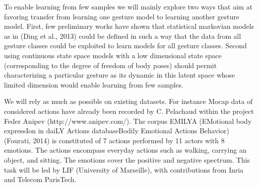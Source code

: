 To enable learning from few samples we will mainly explore two ways that aim at favoring transfer from learning one gesture model to learning another gesture model. First, few preliminary works have shown that statistical markovian models as in (Ding et al., 2013) could be defined in such a way that the data from all gesture classes could be exploited to learn models for all gesture classes. Second using continuous state space models with a low dimensional state space (corresponding to the degree of freedom of body poses) should permit characterizing a particular gesture as its dynamic in this latent space whose limited dimension would enable learning from few samples.  

We will rely as much as possible on existing datasets. For instance Mocap data of considered actions have already been recorded by C. Pelachaud within the project Feder Anipev (http://www.anipev.com/). The corpus EMILYA (EMotional body expressIon in daiLY Actions databaseBodily Emotional Actions Behavior) (Fourati, 2014) is constituted of 7 actions performed by 11 actors with 8 emotions. The actions encompass everyday actions such as walking, carrying an object, and sitting. The emotions cover the positive and negative spectrum. 
This task will be led by LIF (University of Marseille), with contributions from Inria and Telecom ParisTech.

\endinput